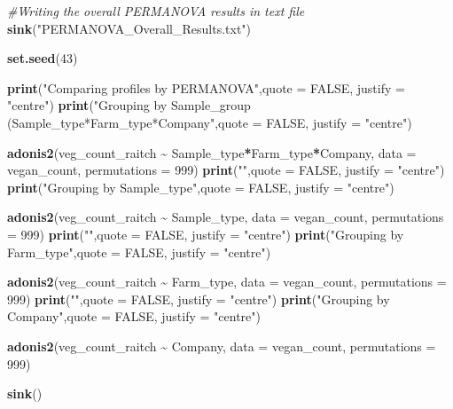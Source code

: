 \documentclass[
]{article}
\newenvironment{Shaded}{\begin{snugshade}}{\end{snugshade}}
\newcommand{\AttributeTok}[1]{\textcolor[rgb]{0.13,0.29,0.53}{#1}}
\newcommand{\CommentTok}[1]{\textcolor[rgb]{0.56,0.35,0.01}{\textit{#1}}}
\newcommand{\ConstantTok}[1]{\textcolor[rgb]{0.56,0.35,0.01}{#1}}
\newcommand{\DecValTok}[1]{\textcolor[rgb]{0.00,0.00,0.81}{#1}}
\newcommand{\FunctionTok}[1]{\textcolor[rgb]{0.13,0.29,0.53}{\textbf{#1}}}
\newcommand{\NormalTok}[1]{#1}
\newcommand{\SpecialCharTok}[1]{\textcolor[rgb]{0.81,0.36,0.00}{\textbf{#1}}}
\newcommand{\StringTok}[1]{\textcolor[rgb]{0.31,0.60,0.02}{#1}}
\begin{document}
\begin{Shaded}
\begin{Highlighting}[]
\CommentTok{\#Writing the overall PERMANOVA results in text file}
\FunctionTok{sink}\NormalTok{(}\StringTok{"PERMANOVA\_Overall\_Results.txt"}\NormalTok{)}


\FunctionTok{set.seed}\NormalTok{(}\DecValTok{43}\NormalTok{)}

\FunctionTok{print}\NormalTok{(}\StringTok{"Comparing profiles by PERMANOVA"}\NormalTok{,}\AttributeTok{quote =} \ConstantTok{FALSE}\NormalTok{, }\AttributeTok{justify =} \StringTok{"centre"}\NormalTok{)}
\FunctionTok{print}\NormalTok{(}\StringTok{"Grouping by Sample\_group (Sample\_type*Farm\_type*Company"}\NormalTok{,}\AttributeTok{quote =} \ConstantTok{FALSE}\NormalTok{, }\AttributeTok{justify =} \StringTok{"centre"}\NormalTok{)}

\FunctionTok{adonis2}\NormalTok{(veg\_count\_raitch }\SpecialCharTok{\textasciitilde{}}\NormalTok{ Sample\_type}\SpecialCharTok{*}\NormalTok{Farm\_type}\SpecialCharTok{*}\NormalTok{Company, }\AttributeTok{data =}\NormalTok{ vegan\_count, }\AttributeTok{permutations =} \DecValTok{999}\NormalTok{)}
\FunctionTok{print}\NormalTok{(}\StringTok{""}\NormalTok{,}\AttributeTok{quote =} \ConstantTok{FALSE}\NormalTok{, }\AttributeTok{justify =} \StringTok{"centre"}\NormalTok{)}
\FunctionTok{print}\NormalTok{(}\StringTok{"Grouping by Sample\_type"}\NormalTok{,}\AttributeTok{quote =} \ConstantTok{FALSE}\NormalTok{, }\AttributeTok{justify =} \StringTok{"centre"}\NormalTok{)}

\FunctionTok{adonis2}\NormalTok{(veg\_count\_raitch }\SpecialCharTok{\textasciitilde{}}\NormalTok{ Sample\_type, }\AttributeTok{data =}\NormalTok{ vegan\_count, }\AttributeTok{permutations =} \DecValTok{999}\NormalTok{)}
\FunctionTok{print}\NormalTok{(}\StringTok{""}\NormalTok{,}\AttributeTok{quote =} \ConstantTok{FALSE}\NormalTok{, }\AttributeTok{justify =} \StringTok{"centre"}\NormalTok{)}
\FunctionTok{print}\NormalTok{(}\StringTok{"Grouping by Farm\_type"}\NormalTok{,}\AttributeTok{quote =} \ConstantTok{FALSE}\NormalTok{, }\AttributeTok{justify =} \StringTok{"centre"}\NormalTok{)}

\FunctionTok{adonis2}\NormalTok{(veg\_count\_raitch }\SpecialCharTok{\textasciitilde{}}\NormalTok{ Farm\_type, }\AttributeTok{data =}\NormalTok{ vegan\_count, }\AttributeTok{permutations =} \DecValTok{999}\NormalTok{)}
\FunctionTok{print}\NormalTok{(}\StringTok{""}\NormalTok{,}\AttributeTok{quote =} \ConstantTok{FALSE}\NormalTok{, }\AttributeTok{justify =} \StringTok{"centre"}\NormalTok{)}
\FunctionTok{print}\NormalTok{(}\StringTok{"Grouping by Company"}\NormalTok{,}\AttributeTok{quote =} \ConstantTok{FALSE}\NormalTok{, }\AttributeTok{justify =} \StringTok{"centre"}\NormalTok{)}

\FunctionTok{adonis2}\NormalTok{(veg\_count\_raitch }\SpecialCharTok{\textasciitilde{}}\NormalTok{ Company, }\AttributeTok{data =}\NormalTok{ vegan\_count, }\AttributeTok{permutations =} \DecValTok{999}\NormalTok{)}

\FunctionTok{sink}\NormalTok{()}
\end{Highlighting}
\end{Shaded}
\end{document}
